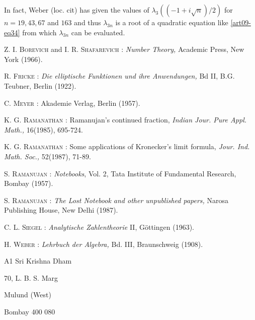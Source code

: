 In fact, Weber (loc. cit) has given the values of $\lambda_{3}((-1+i\sqrt{n})/2)$ for $n=19,43,67$ and $163$ and thus $\lambda_{3n}$ is a root of a quadratic equation like \eqref{art09-eq34} from which $\lambda_{3n}$ can be evaluated.

\begin{thebibliography}{99}
 \textsc{Z. I. Borevich} and \textsc{I. R. Shafarevich :} {\em Number Theory,} Academic Press, New York (1966). 

 \textsc{R. Fricke :} {\em Die elliptische Funktionen und ihre Anwendungen,} Bd II, B.G. Teubner, Berlin (1922). 

 \textsc{C. Meyer :} Akademie Verlag, Berlin (1957).

 \textsc{K. G. Ramanathan :} Ramanujan's continued fraction, {\em Indian Jour. Pure Appl. Math.,} 16(1985), 695-724. 

 \textsc{K. G. Ramanathan :} Some applications of Kronecker's limit formula, {\em Jour. Ind. Math. Soc.,} 52(1987), 71-89. 

 \textsc{S. Ramanujan :} {\em Notebooks}, Vol. 2, Tata Institute of Fundamental Research, Bombay (1957). 

 \textsc{S. Ramanujan :} {\em The Lost Notebook and other unpublished papers,} Narosa Publishing House, New Delhi (1987). 

 \textsc{C. L. Siegel :} {\em Analytische Zahlentheorie} II, G\"ottingen (1963). 

 \textsc{H. Weber :} {\em Lehrbuch der Algebra,} Bd. III, Braunschweig (1908). 
\end{thebibliography}

\bigskip
\noindent
{\small A1 Sri Krishna Dham}

\noindent
{\small 70, L. B. S. Marg}

\noindent
{\small Mulund (West)}

\noindent
{\small Bombay 400 080}



